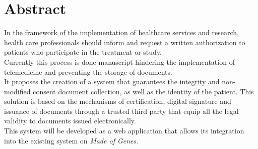 \chapter*{Abstract}
In the framework of the implementation of healthcare services and research, health care professionals should inform and request a written authorization to patients who participate in the treatment or study.\\
\newline Currently this process is done manuscript hindering the implementation of telemedicine and preventing the storage of documents. \\
\newline It proposes the creation of a system that guarantees the integrity and non-modified consent document collection, as well as the identity of the patient. This solution is based on the mechanisms of certification, digital signature and issuance of documents through a trusted third party that equip all the legal validity to documents issued electronically.\\
\newline This system will be developed as a web application that allows its integration into the existing system on \textit{Made of Genes}.
